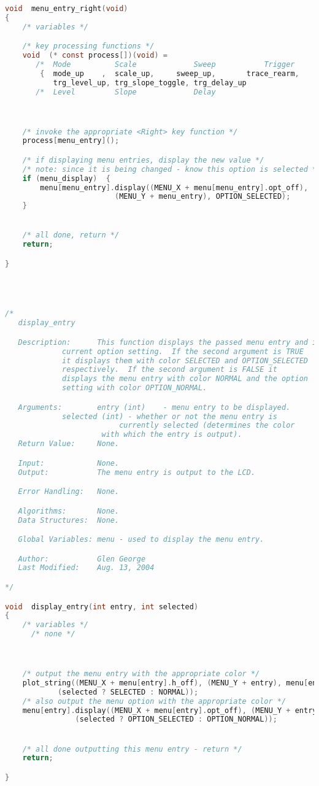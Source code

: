 \begin{lstlisting}[language=C]
void  menu_entry_right(void)
{
    /* variables */

    /* key processing functions */
    void  (* const process[])(void) =
       /*  Mode          Scale             Sweep           Trigger      */
        {  mode_up    ,  scale_up,     sweep_up,       trace_rearm,
           trg_level_up, trg_slope_toggle, trg_delay_up                 };
       /*  Level         Slope             Delay                        */



    /* invoke the appropriate <Right> key function */
    process[menu_entry]();

    /* if displaying menu entries, display the new value */
    /* note: since it is being changed - know this option is selected */
    if (menu_display)  {
        menu[menu_entry].display((MENU_X + menu[menu_entry].opt_off),
    			         (MENU_Y + menu_entry), OPTION_SELECTED);
    }


    /* all done, return */
    return;

}




/*
   display_entry

   Description:      This function displays the passed menu entry and its
   		     current option setting.  If the second argument is TRUE
		     it displays them with color SELECTED and OPTION_SELECTED
		     respectively.  If the second argument is FALSE it
		     displays the menu entry with color NORMAL and the option
		     setting with color OPTION_NORMAL.

   Arguments:        entry (int)    - menu entry to be displayed.
   		     selected (int) - whether or not the menu entry is
		     		      currently selected (determines the color
				      with which the entry is output).
   Return Value:     None.

   Input:            None.
   Output:           The menu entry is output to the LCD.

   Error Handling:   None.

   Algorithms:       None.
   Data Structures:  None.

   Global Variables: menu - used to display the menu entry.

   Author:           Glen George
   Last Modified:    Aug. 13, 2004

*/

void  display_entry(int entry, int selected)
{
    /* variables */
      /* none */



    /* output the menu entry with the appropriate color */
    plot_string((MENU_X + menu[entry].h_off), (MENU_Y + entry), menu[entry].s,
    		(selected ? SELECTED : NORMAL));
    /* also output the menu option with the appropriate color */
    menu[entry].display((MENU_X + menu[entry].opt_off), (MENU_Y + entry),
    			(selected ? OPTION_SELECTED : OPTION_NORMAL));


    /* all done outputting this menu entry - return */
    return;

}
\end{lstlisting}

